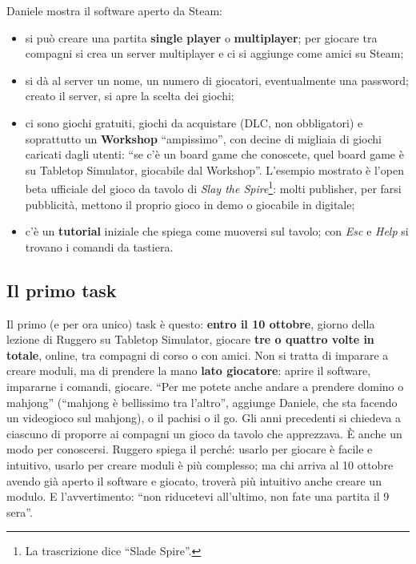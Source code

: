 Daniele mostra il software aperto da Steam:
\begin{itemize}
  \item si può creare una partita \textbf{single player} o \textbf{multiplayer};
        per giocare tra compagni si crea un server multiplayer e ci si aggiunge
        come amici su Steam;
  \item si dà al server un nome, un numero di giocatori, eventualmente una
        password; creato il server, si apre la scelta dei giochi;
  \item ci sono giochi gratuiti, giochi da acquistare (DLC, non obbligatori) e
        soprattutto un \textbf{Workshop} ``ampissimo'', con decine di migliaia di
        giochi caricati dagli utenti: ``se c'è un board game che conoscete,
        quel board game è su Tabletop Simulator, giocabile dal Workshop''.
        L'esempio mostrato è l'open beta ufficiale del gioco da tavolo di
        \emph{Slay the Spire}\footnote{La trascrizione dice ``Slade Spire''.}:
        molti publisher, per farsi pubblicità, mettono il proprio gioco in demo o
        giocabile in digitale;
  \item c'è un \textbf{tutorial} iniziale che spiega come muoversi sul tavolo;
        con \emph{Esc} e \emph{Help} si trovano i comandi da tastiera.
\end{itemize}

\subsection{Il primo task}

Il primo (e per ora unico) task è questo: \textbf{entro il 10 ottobre}, giorno
della lezione di Ruggero su Tabletop Simulator, giocare \textbf{tre o quattro
volte in totale}, online, tra compagni di corso o con amici. Non si tratta di
imparare a creare moduli, ma di prendere la mano \textbf{lato giocatore}: aprire
il software, impararne i comandi, giocare. ``Per me potete anche andare a
prendere domino o mahjong'' (``mahjong è bellissimo tra l'altro'', aggiunge
Daniele, che sta facendo un videogioco sul mahjong), o il pachisi o il go. Gli
anni precedenti si chiedeva a ciascuno di proporre ai compagni un gioco da
tavolo che apprezzava. È anche un modo per conoscersi. Ruggero spiega il
perché: usarlo per giocare è facile e intuitivo, usarlo per creare moduli è più
complesso; ma chi arriva al 10 ottobre avendo già aperto il software e giocato,
troverà più intuitivo anche creare un modulo. E l'avvertimento: ``non riducetevi
all'ultimo, non fate una partita il 9 sera''.

